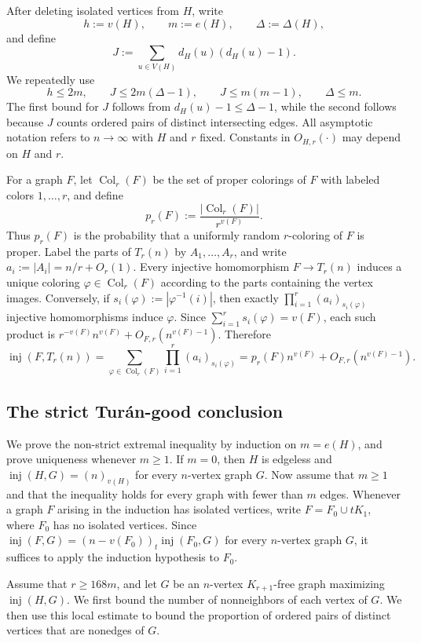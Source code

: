 \documentclass[11pt]{article}
\numberwithin{equation}{section}
\theoremstyle{definition}
\theoremstyle{remark}
\newcommand{\inj}{\operatorname{inj}}
\newcommand{\Col}{\operatorname{Col}}
\begin{document}
After deleting isolated vertices from $H$, write
\[
h:=v(H),\qquad m:=e(H),\qquad \Delta:=\Delta(H),
\]
and define
\[
J:=\sum_{u\in V(H)}d_H(u)(d_H(u)-1).
\]
We repeatedly use
\[
h\le 2m,\qquad J\le 2m(\Delta-1),\qquad J\le m(m-1),\qquad \Delta\le m.
\]
The first bound for $J$ follows from $d_H(u)-1\le \Delta-1$, while the second follows because $J$ counts ordered pairs of distinct intersecting edges. All asymptotic notation refers to $n\to\infty$ with $H$ and $r$ fixed. Constants in $O_{H,r}(\cdot)$ may depend on $H$ and $r$.

For a graph $F$, let $\Col_r(F)$ be the set of proper colorings of $F$ with labeled colors $1,\ldots,r$, and define
\[
p_r(F):=\frac{|\Col_r(F)|}{r^{v(F)}}.
\]
Thus $p_r(F)$ is the probability that a uniformly random $r$-coloring of $F$ is proper. Label the parts of $T_r(n)$ by $A_1,\ldots,A_r$, and write $a_i:=|A_i|=n/r+O_r(1)$. Every injective homomorphism $F\to T_r(n)$ induces a unique coloring $\varphi\in\Col_r(F)$ according to the parts containing the vertex images. Conversely, if $s_i(\varphi):=|\varphi^{-1}(i)|$, then exactly $\prod_{i=1}^r(a_i)_{s_i(\varphi)}$ injective homomorphisms induce $\varphi$. Since $\sum_{i=1}^r s_i(\varphi)=v(F)$, each such product is $r^{-v(F)}n^{v(F)}+O_{F,r}(n^{v(F)-1})$. Therefore
\begin{equation}
\label{eq:Turan-leading-term}
\inj(F,T_r(n))
=\sum_{\varphi\in\Col_r(F)}\prod_{i=1}^r(a_i)_{s_i(\varphi)}
=p_r(F)n^{v(F)}+O_{F,r}(n^{v(F)-1}).
\end{equation}

\subsection{The strict Tur\'an-good conclusion}

We prove the non-strict extremal inequality by induction on $m=e(H)$, and prove uniqueness whenever $m\ge1$. If $m=0$, then $H$ is edgeless and $\inj(H,G)=(n)_{v(H)}$ for every $n$-vertex graph $G$. Now assume that $m\ge1$ and that the inequality holds for every graph with fewer than $m$ edges. Whenever a graph $F$ arising in the induction has isolated vertices, write $F=F_0\cup tK_1$, where $F_0$ has no isolated vertices. Since $\inj(F,G)=(n-v(F_0))_t\inj(F_0,G)$ for every $n$-vertex graph $G$, it suffices to apply the induction hypothesis to $F_0$.

Assume that $r\ge 168m$, and let $G$ be an $n$-vertex $K_{r+1}$-free graph maximizing $\inj(H,G)$. We first bound the number of nonneighbors of each vertex of $G$. We then use this local estimate to bound the proportion of ordered pairs of distinct vertices that are nonedges of $G$.
\end{document}
